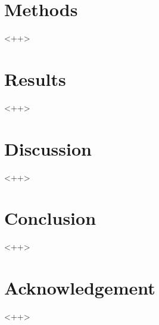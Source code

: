 \documentclass[a4paper]{article}
\begin{document}
\begin{multicols}{2}
\section{Methods}
<++>


\section{Results}
<++>

\section{Discussion}
<++>

\section{Conclusion}
<++>

\section*{Acknowledgement}

\begin{thebibliography}{8}
 <++>
\end{thebibliography}

\end{multicols}
\end{document}
